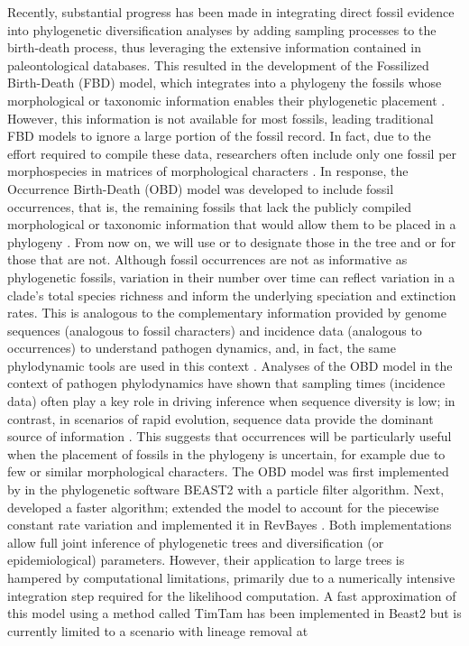 \documentclass[oupdraft]{sysbio}
\begin{document}
Recently, substantial progress has been made in integrating direct fossil evidence into phylogenetic diversification analyses by adding sampling processes to the birth-death process, thus leveraging the extensive information contained in paleontological databases. This resulted in the development of the Fossilized Birth-Death (FBD) model, which integrates into a phylogeny the fossils whose morphological or taxonomic information enables their phylogenetic placement \citep{stadler_sampling-through-time_2010, heath_fossilized_2014}. However, this information is not available for most fossils, leading traditional FBD models to ignore a large portion of the fossil record. In fact, due to the effort required to compile these data, researchers often include only one fossil per morphospecies in matrices of morphological characters \citep{wright_integrating_2022}. In response, the Occurrence Birth-Death (OBD) model was developed to include fossil occurrences, that is, the remaining fossils that lack the publicly compiled morphological or taxonomic information that would allow them to be placed in a phylogeny \citep{vaughan_estimating_2019, gupta_probability_2020, andreoletti_occurrence_2022}. From now on, we will use  or  to designate those in the tree and  or  for those that are not. Although fossil occurrences are not as informative as phylogenetic fossils, variation in their number over time can reflect variation in a clade's total species richness and inform the underlying speciation and extinction rates. This is analogous to the complementary information provided by genome sequences (analogous to fossil characters) and incidence data (analogous to occurrences) to understand pathogen dynamics, and, in fact, the same phylodynamic tools are used in this context \citep{macpherson_unifying_2022, stadler_decoding_2024}. Analyses of the OBD model in the context of pathogen phylodynamics have shown that sampling times (incidence data) often play a key role in driving inference when sequence diversity is low; in contrast, in scenarios of rapid evolution, sequence data provide the dominant source of information \citep{featherstone_decoding_2023}. This suggests that occurrences will be particularly useful when the placement of fossils in the phylogeny is uncertain, for example due to few or similar morphological characters. The OBD model was first implemented by \citet{vaughan_estimating_2019} in the phylogenetic software BEAST2 \citep{bouckaert_beast_2019} with a particle filter algorithm. Next, \citet{gupta_probability_2020} developed a faster algorithm; \citet{andreoletti_occurrence_2022} extended the model to account for the piecewise constant rate variation and implemented it in RevBayes \citep{hohna_revbayes_2016}. Both implementations allow full joint inference of phylogenetic trees and diversification (or epidemiological) parameters. However, their application to large trees is hampered by computational limitations, primarily due to a numerically intensive integration step required for the likelihood computation. A fast approximation of this model using a method called TimTam \citep{zarebski_estimating_2025} has been implemented in Beast2 but is currently limited to a scenario with lineage removal at 
\end{document}
